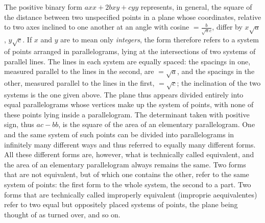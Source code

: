 The positive binary form $axx+2bxy+cyy$ represents, in general, the square of the distance between two unspecified points in a plane whose coordinates, relative to two axes inclined to one another at an angle with cosine $=\frac{b}{\surd ac}$, differ by $x\surd a$, $y\surd c$. If $x$ and $y$ are to mean only \emph{integers}, the form therefore refers to a system of points arranged in parallelograms, lying at the intersections of two systems of parallel lines. The lines in each system are equally spaced: the spacings in one, measured parallel to the lines in the second, are $=\surd a$, and the spacings in the other, measured parallel to the lines in the first, $=\surd c$; the inclination of the two systems is the one given above. The plane thus appears divided entirely into equal parallelograms whose vertices make up the system of points, with none of these points lying inside a parallelogram. The determinant taken with positive sign, thus $ac-bb$, is the square of the area of an elementary parallelogram. One and the same system of such points can be divided into parallelograms in infinitely many different ways and thus referred to equally many different forms. All these different forms are, however, what is technically called equivalent, and the area of an elementary parallelogram always remains the same. Two forms that are not equivalent, but of which one contains the other, refer to the same system of points: the first form to the whole system, the second to a part. Two forms that are technically called improperly equivalent (improprie aequivalentes) refer to two equal but oppositely placed systems of points, the plane being thought of as turned over, and so on.

